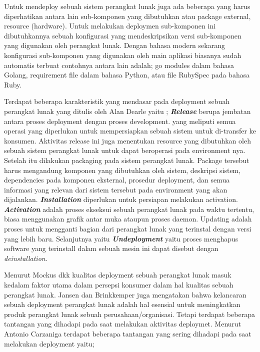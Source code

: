 Untuk mendeploy sebuah sistem perangkat lunak juga ada beberapa yang harus diperhatikan antara lain sub-komponen yang dibutuhkan atau package external,
resource (hardware). Untuk melakukan deploymen sub-komponen ini dibutuhkannya sebuah konfigurasi yang mendeskripsikan versi sub-komponen yang digunakan oleh perangkat lunak.
Dengan bahasa modern sekarang konfigurasi sub-komponen yang digunakan oleh main aplikasi biasanya sudah automatis terbuat contohnya antara lain adalah;
go modules  \cite{gomod} dalam bahasa Golang, requirement file  \cite{requirementPython} dalam bahasa Python, atau file RubySpec  \cite{rubySpec} pada bahasa Ruby.
\par
Terdapat beberapa karakteristik yang mendasar pada deployment sebuah perangkat lunak yang ditulis oleh Alan Dearle yaitu  \cite{Dearle2007};
\textbf{\textit{Release}} berupa jembatan antara proses deployment dengan proses development. yang meliputi semua operasi
yang diperlukan untuk mempersiapkan sebuah sistem  untuk di-transfer ke konsumen.
Aktivitas release ini juga menentukan resource yang dibutuhkan oleh sebuah sistem perangkat lunak untuk dapat beroperasi pada environment nya.
Setelah itu dilakukan packaging pada sistem perangkat lunak.
Package tersebut harus mengandung komponen yang dibutuhkan oleh sistem, deskripsi sistem, dependencies pada komponen eksternal, prosedur deployment,
dan semua informasi yang relevan dari sistem tersebut pada environment yang akan dijalankan.
\textbf{\textit{Installation}} diperlukan untuk persiapan melakukan activation. \textbf{\textit{Activation}} adalah proses ekseksui sebuah perangkat lunak pada waktu tertentu, biasa menggunakan grafik antar muka ataupun proses daemon.
Updating adalah proses untuk mengganti bagian dari perangkat lunak yang terinstal dengan versi yang lebih baru.
Selanjutnya yaitu \textbf{\textit{Undeployment}} yaitu proses menghapus software yang terinstall dalam sebuah mesin ini dapat disebut dengan \textit{deinstallation}.
\par
Menurut Mockus dkk  \cite{Mockus2005} kualitas deployment sebuah perangkat lunak masuk kedalam faktor utama dalam persepsi konsumer dalam hal kualitas sebuah perangkat lunak.
Jansen dan Brinkkemper  \cite{Jansen2006} juga mengatakan bahwa kelancaran sebuah deployment perangkat lunak adalah hal esensial untuk meningkatkan produk perangkat lunak sebuah perusahaan/organisasi.
Tetapi terdapat beberapa tantangan yang dihadapi pada saat melakukan aktivitas deploymet.
Menurut Antonio Carzaniga  \cite{Carzaniga1998} terdapat beberapa tantangan yang sering dihadapi pada saat melakukan deployment yaitu;
